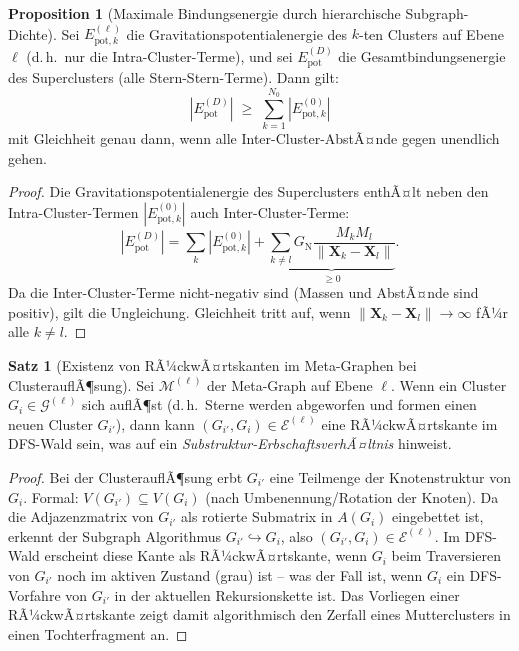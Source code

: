 ﻿\documentclass[a4paper,12pt]{report}
\theoremstyle{definition}
\newtheorem{satz}{Satz}
\newtheorem{proposition}{Proposition}
\begin{document}
\begin{proposition}[Maximale Bindungsenergie durch hierarchische Subgraph-Dichte]
\label{prop:max_bind}
Sei $E^{(\ell)}_{\mathrm{pot},k}$ die Gravitationspotentialenergie des $k$-ten Clusters auf Ebene~$\ell$ (d.\,h.\ nur die Intra-Cluster-Terme), und sei $E^{(D)}_\mathrm{pot}$ die Gesamtbindungsenergie des Superclusters (alle Stern-Stern-Terme). Dann gilt:
\[
|E^{(D)}_\mathrm{pot}| \;\geq\; \sum_{k=1}^{N_0} |E^{(0)}_{\mathrm{pot},k}|
\]
mit Gleichheit genau dann, wenn alle Inter-Cluster-AbstÃ¤nde gegen unendlich gehen.
\end{proposition}

\begin{proof}
Die Gravitationspotentialenergie des Superclusters enthÃ¤lt neben den Intra-Cluster-Termen $|E^{(0)}_{\mathrm{pot},k}|$ auch Inter-Cluster-Terme:
\[
|E^{(D)}_\mathrm{pot}| = \sum_{k} |E^{(0)}_{\mathrm{pot},k}|
+ \underbrace{\sum_{k \neq l} G_\mathrm{N} \frac{M_k M_l}{\|\mathbf{X}_k - \mathbf{X}_l\|}}_{\geq 0}.
\]
Da die Inter-Cluster-Terme nicht-negativ sind (Massen und AbstÃ¤nde sind positiv), gilt die Ungleichung. Gleichheit tritt auf, wenn $\|\mathbf{X}_k - \mathbf{X}_l\| \to \infty$ fÃ¼r alle $k \neq l$.
\end{proof}

\begin{satz}[Existenz von RÃ¼ckwÃ¤rtskanten im Meta-Graphen bei ClusterauflÃ¶sung]
\label{satz:rueckwaertskanten}
Sei $\mathcal{M}^{(\ell)}$ der Meta-Graph auf Ebene $\ell$. Wenn ein Cluster $G_i \in \mathcal{G}^{(\ell)}$ sich auflÃ¶st (d.\,h.\ Sterne werden abgeworfen und formen einen neuen Cluster $G_{i'}$), dann kann $(G_{i'}, G_i) \in \mathcal{E}^{(\ell)}$ eine RÃ¼ckwÃ¤rtskante im DFS-Wald sein, was auf ein \emph{Substruktur-ErbschaftsverhÃ¤ltnis} hinweist.
\end{satz}

\begin{proof}
Bei der ClusterauflÃ¶sung erbt $G_{i'}$ eine Teilmenge der Knotenstruktur von $G_i$. Formal: $V(G_{i'}) \subseteq V(G_i)$ (nach Umbenennung/Rotation der Knoten). Da die Adjazenzmatrix von $G_{i'}$ als rotierte Submatrix in $A(G_i)$ eingebettet ist, erkennt der Subgraph Algorithmus $G_{i'} \hookrightarrow G_i$, also $(G_{i'}, G_i) \in \mathcal{E}^{(\ell)}$. Im DFS-Wald erscheint diese Kante als RÃ¼ckwÃ¤rtskante, wenn $G_i$ beim Traversieren von $G_{i'}$ noch im aktiven Zustand (grau) ist -- was der Fall ist, wenn $G_i$ ein DFS-Vorfahre von $G_{i'}$ in der aktuellen Rekursionskette ist. Das Vorliegen einer RÃ¼ckwÃ¤rtskante zeigt damit algorithmisch den Zerfall eines Mutterclusters in einen Tochterfragment an.
\end{proof}
\end{document}

